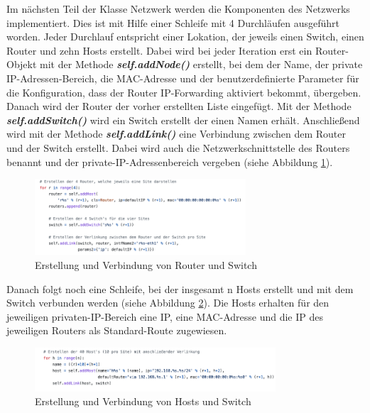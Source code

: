 \documentclass[fontsize=12pt,paper=a4,open=any,parskip=half,
  twoside=false,toc=listof,toc=bibliography,fleqn,leqno,
  captions=nooneline,captions=tableabove,british]{scrbook}
\begin{document}
Im nächsten Teil der Klasse Netzwerk werden die Komponenten des Netzwerks implementiert. Dies ist mit Hilfe einer Schleife mit 4 Durchläufen ausgeführt worden. Jeder Durchlauf entspricht einer Lokation, der jeweils einen Switch, einen Router und zehn Hosts erstellt. Dabei wird bei jeder Iteration erst ein Router-Objekt mit der Methode \textit{\textbf{self.addNode()}} erstellt, bei dem der Name, der private IP-Adressen-Bereich, die MAC-Adresse und der benutzerdefinierte Parameter für die Konfiguration, dass der Router IP-Forwarding aktiviert bekommt, übergeben. Danach wird der Router der vorher erstellten Liste eingefügt. Mit der Methode \textit{\textbf{self.addSwitch()}} wird ein Switch erstellt der einen Namen erhält. Anschließend wird mit der Methode \textit{\textbf{self.addLink()}} eine Verbindung zwischen dem Router und der Switch erstellt. Dabei wird auch die Netzwerkschnittstelle des Routers benannt und der private-IP-Adressenbereich vergeben  (siehe Abbildung \ref{mininet2}).

\begin{figure}[H]
 \centering
 \includegraphics[width=0.7\textwidth]{Bilder/mininet2}
 \captionsetup{justification=centering,margin=1cm}
 \caption{Erstellung und Verbindung von Router und Switch}
 \label{mininet2}
\end{figure}

Danach folgt noch eine Schleife, bei der insgesamt n Hosts erstellt und mit dem Switch verbunden werden (siehe Abbildung \ref{mininet3}). Die Hosts erhalten für den jeweiligen privaten-IP-Bereich eine IP, eine MAC-Adresse und die IP des jeweiligen Routers als Standard-Route zugewiesen.
 
\begin{figure}[H]
 \centering
 \includegraphics[width=0.8\textwidth]{Bilder/mininet3}
 \captionsetup{justification=centering,margin=1cm}
 \caption{Erstellung und Verbindung von Hosts und Switch}
 \label{mininet3}
\end{figure}
\end{document}
